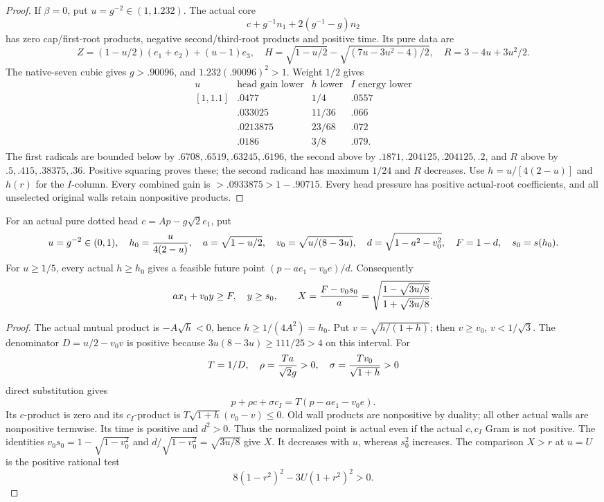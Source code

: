 \begin{proof}
If \(\beta=0\), put \(u=g^{-2}\in(1,1.232)\). The actual core
\[
 c+g^{-1}n_1+2(g^{-1}-g)n_2
\]
has zero cap/first-root products, negative second/third-root products
and positive time. Its pure data are
\[
 Z=(1-u/2)(e_1+e_2)+(u-1)e_3,\quad
 H=\sqrt{1-u/2}-\sqrt{(7u-3u^2-4)/2},\quad
 R=3-4u+3u^2/2.
\]
The native-seven cubic gives \(g>.90096\), and
\(1.232(.90096)^2>1\). Weight \(1/2\) gives
\[
\begin{array}{c|c|c|c}
u&\text{head gain lower}&h\text{ lower}&I\text{ energy lower}\\ \hline
[1,1.1]&.0477&1/4&.0557\\
[1.1,1.15]&.033025&11/36&.066\\
[1.15,1.2]&.0213875&23/68&.072\\
[1.2,1.232]&.0186&3/8&.079 .
\end{array}
\]
The first radicals are bounded below by
\(.6708,.6519,.63245,.6196\), the second above by
\(.1871,.204125,.204125,.2\), and \(R\) above by
\(.5,.415,.38375,.36\). Positive squaring proves these;
the second radicand has maximum \(1/24\) and \(R\) decreases.
Use \(h=u/[4(2-u)]\) and \(h(r)\) for the \(I\)-column.
Every combined gain is \(>.0933875>1-.90715\).
Every head pressure has positive actual-root coefficients, and all
unselected original walls retain nonpositive products.
\end{proof}

\begin{lemma}
\label{lem:I-pure-dotted-joint-point}
For an actual pure dotted head \(c=Ap-g\sqrt2e_1\), put
\[
 u=g^{-2}\in(0,1),\quad h_0={u\over4(2-u)},\quad
 a=\sqrt{1-u/2},\quad v_0=\sqrt{u/(8-3u)},\quad
 d=\sqrt{1-a^2-v_0^2},\quad F=1-d,\quad s_0=s(h_0).
\]
For \(u\ge1/5\), every actual \(h\ge h_0\) gives a feasible
future point \((p-ae_1-v_0e)/d\). Consequently
\[
 a x_1+v_0y\ge F,\quad y\ge s_0,\qquad
 X={F-v_0s_0\over a}
 =\sqrt{{1-\sqrt{3u/8}\over1+\sqrt{3u/8}}}.
\]
\end{lemma}
\begin{proof}
The actual mutual product is \(-A\sqrt h<0\), hence
\(h\ge1/(4A^2)=h_0\). Put \(v=\sqrt{h/(1+h)}\);
then \(v\ge v_0\), \(v<1/\sqrt3\).
The denominator \(D=u/2-v_0v\) is positive because
\(3u(8-3u)\ge111/25>4\) on this interval. For
\[
 T=1/D,\quad \rho={Ta\over\sqrt2g}>0,\quad
 \sigma={Tv_0\over\sqrt{1+h}}>0
\]
direct substitution gives
\[
 p+\rho c+\sigma c_I=T(p-ae_1-v_0e).
\]
Its \(c\)-product is zero and its \(c_I\)-product is
\(T\sqrt{1+h}(v_0-v)\le0\). Old wall products are nonpositive
by duality; all other actual walls are nonpositive termwise.
Its time is positive and \(d^2>0\). Thus the normalized point is
actual even if the actual \(c,c_I\) Gram is not positive.
The identities \(v_0s_0=1-\sqrt{1-v_0^2}\) and
\(d/\sqrt{1-v_0^2}=\sqrt{3u/8}\) give \(X\).
It decreases with \(u\), whereas \(s_0^2\) increases.
The comparison \(X>r\) at \(u=U\) is the positive rational test
\[
 8(1-r^2)^2-3U(1+r^2)^2>0.
\]
\end{proof}

